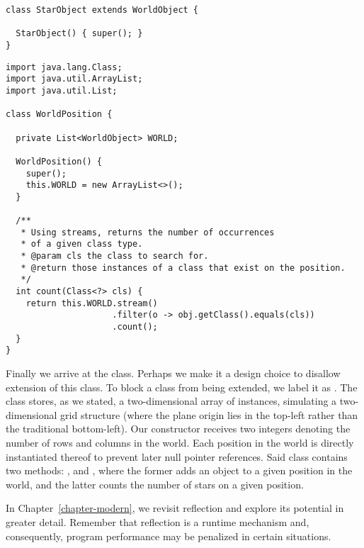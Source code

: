 \begin{lstlisting}[language=MyJava]
class StarObject extends WorldObject {
  
  StarObject() { super(); }
}
\end{lstlisting}


\begin{lstlisting}[language=MyJava]
import java.lang.Class;
import java.util.ArrayList;
import java.util.List;

class WorldPosition {

  private List<WorldObject> WORLD;

  WorldPosition() { 
    super(); 
    this.WORLD = new ArrayList<>();  
  }

  /**
   * Using streams, returns the number of occurrences 
   * of a given class type.
   * @param cls the class to search for.
   * @return those instances of a class that exist on the position.
   */
  int count(Class<?> cls) {
    return this.WORLD.stream()
                     .filter(o -> obj.getClass().equals(cls))
                     .count();
  }
}
\end{lstlisting}

Finally we arrive at the  class. 
Perhaps we make it a design choice to disallow extension of this class. 
To block a class from being extended, we label it as . 
The  class stores, as we stated, a two-dimensional array of  instances, simulating a two-dimensional grid structure (where the plane origin lies in the top-left rather than the traditional bottom-left). 
Our constructor receives two integers denoting the number of rows and columns in the world. 
Each position in the world is directly instantiated thereof to prevent later null pointer references. 
Said  class contains two methods: , and , where the former adds an object to a given position in the world, and the latter counts the number of stars on a given position.

In Chapter~\ref{chapter-modern}, we revisit reflection and explore its potential in greater detail. 
Remember that reflection is a runtime mechanism and, consequently, program performance may be penalized in certain situations.


